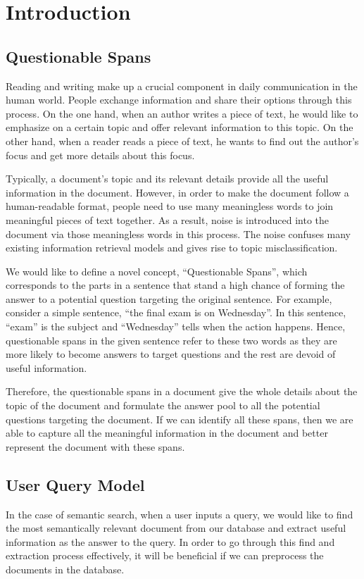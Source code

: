\section{Introduction}
\subsection{Questionable Spans}
Reading and writing make up a crucial component in daily communication in the human world. People exchange information and share their options through this process. On the one hand, when an author writes a piece of text, he would like to emphasize on a certain topic and offer relevant information to this topic. On the other hand, when a reader reads a piece of text, he wants to find out the author's focus and get more details about this focus.

Typically, a document's topic and its relevant details provide all the useful information in the document. However, in order to make the document follow a human-readable format, people need to use many meaningless words to join meaningful pieces of text together. As a result, noise is introduced into the document via those meaningless words in this process. The noise confuses many existing information retrieval models and gives rise to topic misclassification.

We would like to define a novel concept, ``Questionable Spans'', which corresponds to the parts in a sentence that stand a high chance of forming the answer to a potential question targeting the original sentence. For example, consider a simple sentence, ``the final exam is on Wednesday''. In this sentence, ``exam'' is the subject and ``Wednesday'' tells when the action happens. Hence, questionable spans in the given sentence refer to these two words as they are more likely to become answers to target questions and the rest are devoid of useful information.

Therefore, the questionable spans in a document give the whole details about the topic of the document and formulate the answer pool to all the potential questions targeting the document. If we can identify all these spans, then we are able to capture all the meaningful information in the document and better represent the document with these spans.


\subsection{User Query Model}
In the case of semantic search, when a user inputs a query, we would like to find the most semantically relevant document from our database and extract useful information as the answer to the query. In order to go through this find and extraction process effectively, it will be beneficial if we can preprocess the documents in the database.

